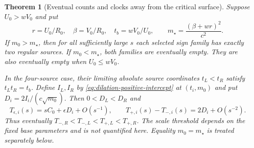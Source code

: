 \documentclass[11pt,a4paper]{article}
\newtheorem{theorem}{Theorem}[section]
\theoremstyle{remark}\newtheorem{remark}[theorem]{Remark}
\begin{document}
\begin{theorem}[Eventual counts and clocks away from the critical surface]
\label{thm:dilation-strict}
Suppose $U_0>wV_0$ and put
\[
 r=U_0/R_0,\quad \beta=V_0/R_0,\quad t_b=wV_0/U_0,
 \qquad m_\star=\frac{(\beta+wr)^2}{c^2}.
\]
If $m_0>m_\star$, then for all sufficiently large $s$ each selected
sign family has exactly two regular sources. If $m_0<m_\star$, both
families are eventually empty. They are also eventually empty when
$U_0\le wV_0$.

In the four-source case, their limiting absolute source coordinates
$t_L<t_R$ satisfy $t_Lt_R=t_b$. Define $I_L,I_R$ by
\eqref{eq:dilation-positive-intercept} at $(t_i,m_0)$ and put
$D_i=2I_i/(c\sqrt{m_0})$. Then $0<D_L<D_R$ and
\begin{equation}\label{eq:dilation-clock-offsets}
 T_{\epsilon,i}(s)=sC_0+\epsilon D_i+O(s^{-1}),\qquad
 T_{+,i}(s)-T_{-,i}(s)=2D_i+O(s^{-2}).
\end{equation}
Thus eventually
$T_{-,R}<T_{-,L}<T_{+,L}<T_{+,R}$.
The scale threshold depends on the fixed base parameters and is not
quantified here. Equality $m_0=m_\star$ is treated separately below.
\end{theorem}
\end{document}

